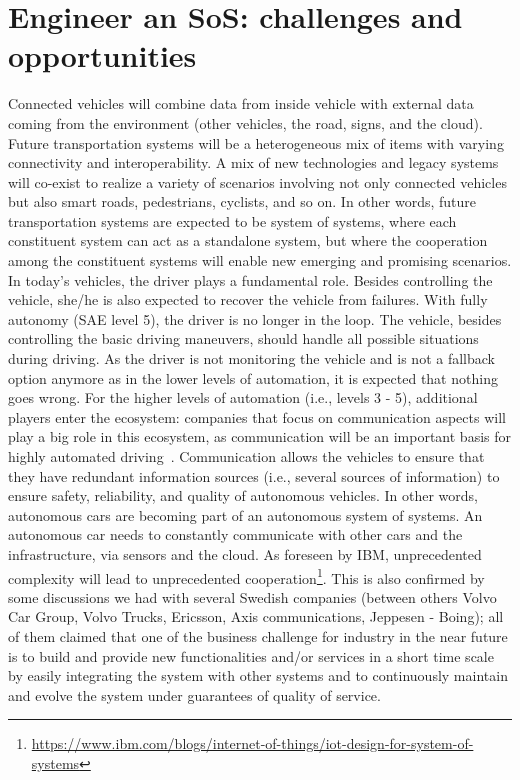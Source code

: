 \section{Engineer an SoS: challenges and opportunities}




Connected vehicles  will combine data from inside vehicle
with external data coming from the environment (other vehicles, the road, signs,
and the cloud).
Future transportation systems will be a heterogeneous mix of items with varying connectivity and interoperability. A mix of new technologies and legacy systems will co-exist to realize a variety of scenarios involving not only connected vehicles but also smart roads, pedestrians, cyclists, and so on. In other words, future transportation systems are expected to be system of systems, where each constituent system can act as a standalone system, but where the cooperation among the constituent systems will enable new emerging and promising scenarios.  
In today's vehicles, the driver plays a fundamental role. Besides controlling
the vehicle, she/he is also expected to recover the vehicle from failures. With fully
autonomy (SAE level 5), the driver is no longer in the loop. The vehicle, besides
controlling the basic driving maneuvers, should handle all possible situations during
driving. As the driver is not monitoring the vehicle and is not a fallback option
anymore as in the lower levels of automation, it is expected that nothing goes wrong.
For the higher levels of automation (i.e., levels 3 - 5), additional players enter the
ecosystem: companies that focus on communication aspects will play a big role in
this ecosystem, as communication will be an important basis for highly automated
driving~\cite{Knauss2017challenges}. Communication allows the vehicles to ensure that they have redundant
information sources (i.e., several sources of information) to ensure safety, reliability,
and quality of autonomous vehicles. In other words, autonomous cars are becoming part of an autonomous system of systems. An autonomous car needs to constantly communicate with other cars and the infrastructure, via sensors and the cloud. As foreseen by IBM, unprecedented complexity will lead to unprecedented cooperation\footnote{ \url{https://www.ibm.com/blogs/internet-of-things/iot-design-for-system-of-systems}}. This is also confirmed by some discussions we had with several Swedish companies (between others Volvo Car Group, Volvo Trucks, Ericsson,
Axis communications, Jeppesen - Boing); all of them claimed that one of the business challenge for industry
in the near future is to build and provide new functionalities and/or services in a short time scale by easily integrating
the system with other systems and to continuously maintain and evolve the system under guarantees of
quality of service.


